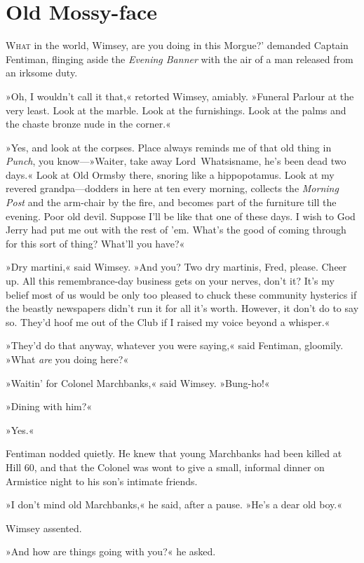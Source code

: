 \chapter{Old Mossy-face}
\lettrine[lines=4,ante=‘]{W}{hat} in the world, Wimsey, are you doing in this  Morgue?' demanded Captain Fentiman, flinging aside the \textit{Evening Banner} with the air of a man released from an irksome duty.

\zz
»Oh, I wouldn't call it that,« retorted Wimsey, amiably. »Funeral Parlour at the very least. Look at the marble. Look at the furnishings. Look at the palms and the chaste bronze nude in the corner.«

»Yes, and look at the corpses. Place always reminds me of that old thing in \textit{Punch}, you know—»Waiter, take away Lord~Whatsisname, he's been dead two days.« Look at Old Ormsby there, snoring like a hippopotamus. Look at my revered grandpa—dodders in here at ten every morning, collects the \textit{Morning Post} and the arm-chair by the fire, and becomes part of the furniture till the evening. Poor old devil. Suppose I'll be like that one of these days. I wish to God Jerry had put me out with the rest of 'em. What's the good of coming through for this sort of thing? What'll you have?«

»Dry martini,« said Wimsey. »And you? Two dry martinis, Fred, please. Cheer up. All this remembrance-day business gets on your nerves, don't it? It's my belief most of us would be only too pleased to chuck these community hysterics if the beastly newspapers didn't run it for all it's worth. However, it don't do to say so. They'd hoof me out of the Club if I raised my voice beyond a whisper.«

»They'd do that anyway, whatever you were saying,« said Fentiman, gloomily. »What \textit{are} you doing here?«

»Waitin' for Colonel Marchbanks,« said Wimsey. »Bung-ho!«

»Dining with him?«

»Yes.«

Fentiman nodded quietly. He knew that young Marchbanks had been killed at Hill 60, and that the Colonel was wont to give a small, informal dinner on Armistice night to his son's intimate friends.

»I don't mind old Marchbanks,« he said, after a pause. »He's a dear old boy.«

Wimsey assented.

»And how are things going with you?« he asked.

